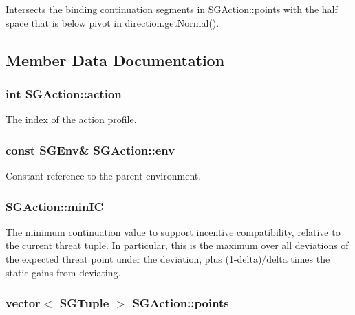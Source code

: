 Intersects the binding continuation segments in \hyperlink{classSGAction_a8860ada2cacece1a8feed794d81d9e9f}{S\-G\-Action\-::points} with the half space that is below pivot in direction.\-get\-Normal(). 

\subsection{Member Data Documentation}
\hypertarget{classSGAction_a65c62a3804b50febd9a289f3d8902f85}{
\subsubsection[{action}]{\setlength{\rightskip}{0pt plus 5cm}int S\-G\-Action\-::action\hspace{0.3cm}{\ttfamily [protected]}}}\label{classSGAction_a65c62a3804b50febd9a289f3d8902f85}
The index of the action profile. \hypertarget{classSGAction_a5ae60f6fd5a545d13c8a2525d7378b9d}{
\subsubsection[{env}]{\setlength{\rightskip}{0pt plus 5cm}const {\bf S\-G\-Env}\& S\-G\-Action\-::env\hspace{0.3cm}{\ttfamily [protected]}}}\label{classSGAction_a5ae60f6fd5a545d13c8a2525d7378b9d}
Constant reference to the parent environment. \hypertarget{classSGAction_a20b96be3274e3cd2bc1be0d218fc2b06}{
\subsubsection[{min\-I\-C}]{ S\-G\-Action\-::min\-I\-C\hspace{0.3cm}{\ttfamily [protected]}}}\label{classSGAction_a20b96be3274e3cd2bc1be0d218fc2b06}
The minimum continuation value to support incentive compatibility, relative to the current threat tuple. In particular, this is the maximum over all deviations of the expected threat point under the deviation, plus (1-\/delta)/delta times the static gains from deviating. \hypertarget{classSGAction_a8860ada2cacece1a8feed794d81d9e9f}{
\subsubsection[{points}]{\setlength{\rightskip}{0pt plus 5cm}vector$<$ {\bf S\-G\-Tuple} $>$ S\-G\-Action\-::points\hspace{0.3cm}{\ttfamily [protected]}}}\label{classSGAction_a8860ada2cacece1a8feed794d81d9e9f}
